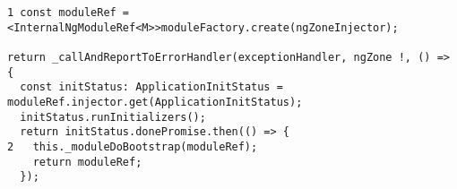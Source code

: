 \begin{verbatim}
1 const moduleRef =
<InternalNgModuleRef<M>>moduleFactory.create(ngZoneInjector);

return _callAndReportToErrorHandler(exceptionHandler, ngZone !, () => {
  const initStatus: ApplicationInitStatus =
moduleRef.injector.get(ApplicationInitStatus);
  initStatus.runInitializers();
  return initStatus.donePromise.then(() => {
2   this._moduleDoBootstrap(moduleRef);
    return moduleRef;
  });
\end{verbatim}
